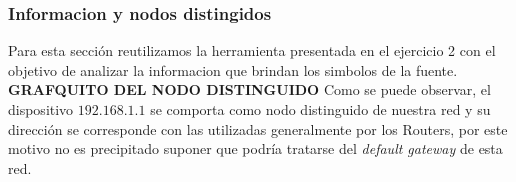  \subsubsection{Informacion y nodos distingidos}
 Para esta secci\'on reutilizamos la herramienta presentada en el ejercicio 2 con el objetivo de analizar la informacion que brindan los simbolos de la fuente.
 \textbf{GRAFQUITO DEL NODO DISTINGUIDO}
 Como se puede observar, el dispositivo $192.168.1.1$ se comporta como nodo distinguido de nuestra red y su direcci\'on se corresponde con las utilizadas generalmente por los Routers, por este motivo no es precipitado suponer que podr\'ia tratarse del \emph{default gateway} de esta red.

 
